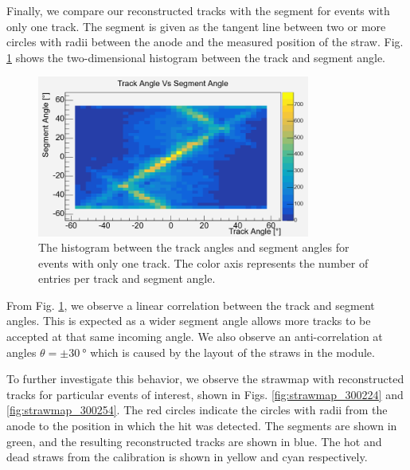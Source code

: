 \documentclass[a4paper]{report}
\numberwithin{equation}{section}
\begin{document}
Finally, we compare our reconstructed tracks with the segment for events with only one track. 
The segment is given as the tangent line between two or more circles with radii between the anode and the measured position of the straw. 
Fig. \ref{fig:trackvssegment} shows the two-dimensional histogram between the track and segment angle. 

\begin{figure}[!h]
	\centering
	\includegraphics[width=0.8\textwidth]{tracksvssegments.png}
	\caption{The histogram between the track angles and segment angles for events with only one track. The 
	color axis represents the number of entries per track and segment angle.}
	\label{fig:trackvssegment}
\end{figure}

From Fig. \ref{fig:trackvssegment}, we observe a linear correlation between the track and segment angles. This is expected as a wider segment angle allows more tracks to be accepted at 
that same incoming angle. We also observe an anti-correlation at angles $\theta = \pm \SI{30}{\degree}$ which is caused by the 
layout of the straws in the module. \par 

To further investigate this behavior, we observe the strawmap with reconstructed tracks for particular events of interest, shown in Figs. 
\ref{fig:strawmap_300224} and \ref{fig:strawmap_300254}. The red circles indicate the circles with radii from the anode to the 
position in which the hit was detected. The segments are shown in green, and the resulting reconstructed tracks are shown in blue. 
The hot and dead straws from the calibration is shown in yellow and cyan respectively.\par 
\end{document}
